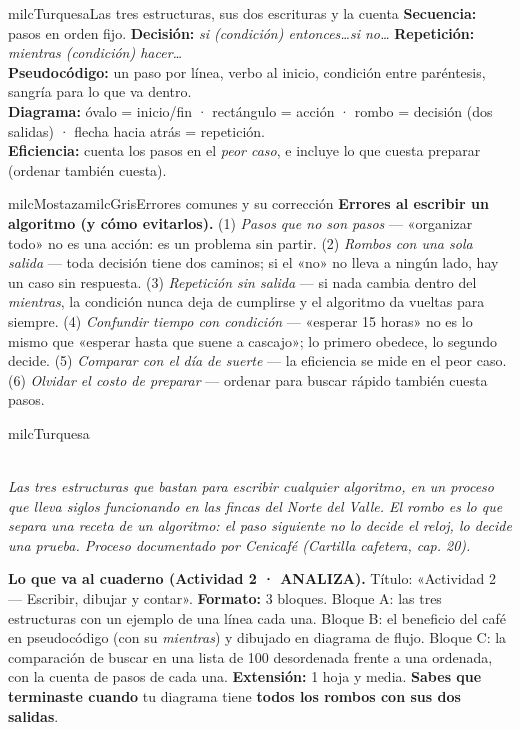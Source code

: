 \documentclass[11pt,letterpaper]{article}
\newcommand{\guiaDiagrama}[2]{%
\begin{center}
\\[1.5mm]
{\footnotesize\itshape\textcolor{milcNegro!75}{#2}}
\end{center}
}
\begin{document}
\begin{drawbox}{milcTurquesa}{Las tres estructuras, sus dos escrituras y la cuenta}
\textbf{Secuencia:} pasos en orden fijo. \textbf{Decisión:} \emph{si (condición) entonces\ldots si no\ldots} \textbf{Repetición:} \emph{mientras (condición) hacer\ldots} \\[1mm]
\textbf{Pseudocódigo:} un paso por línea, verbo al inicio, condición entre paréntesis, sangría para lo que va dentro. \\[1mm]
\textbf{Diagrama:} óvalo = inicio/fin · rectángulo = acción · rombo = decisión (dos salidas) · flecha hacia atrás = repetición. \\[1mm]
\textbf{Eficiencia:} cuenta los pasos en el \emph{peor caso}, e incluye lo que cuesta preparar (ordenar también cuesta).
\end{drawbox}

\begin{softbox}{milcMostaza}{milcGris}{Errores comunes y su corrección}
\textbf{Errores al escribir un algoritmo (y cómo evitarlos).} (1) \emph{Pasos que no son pasos} --- «organizar todo» no es una acción: es un problema sin partir. (2) \emph{Rombos con una sola salida} --- toda decisión tiene dos caminos; si el «no» no lleva a ningún lado, hay un caso sin respuesta. (3) \emph{Repetición sin salida} --- si nada cambia dentro del \emph{mientras}, la condición nunca deja de cumplirse y el algoritmo da vueltas para siempre. (4) \emph{Confundir tiempo con condición} --- «esperar 15 horas» no es lo mismo que «esperar hasta que suene a cascajo»; lo primero obedece, lo segundo decide. (5) \emph{Comparar con el día de suerte} --- la eficiencia se mide en el peor caso. (6) \emph{Olvidar el costo de preparar} --- ordenar para buscar rápido también cuesta pasos.
\end{softbox}

\begin{infoband}{milcTurquesa}
\guiaDiagrama{assets/pensamiento-computacional-2/flujo-beneficio-cafe.tex}{Las tres estructuras que bastan para escribir cualquier algoritmo, en un proceso que lleva siglos funcionando en las fincas del Norte del Valle. El rombo es lo que separa una receta de un algoritmo: el paso siguiente no lo decide el reloj, lo decide una prueba. Proceso documentado por Cenicafé (Cartilla cafetera, cap. 20).}

\textbf{Lo que va al cuaderno (Actividad 2 · ANALIZA).} Título: «Actividad 2 --- Escribir, dibujar y contar». \textbf{Formato:} 3 bloques. Bloque A: las tres estructuras con un ejemplo de una línea cada una. Bloque B: el beneficio del café en pseudocódigo (con su \emph{mientras}) y dibujado en diagrama de flujo. Bloque C: la comparación de buscar en una lista de 100 desordenada frente a una ordenada, con la cuenta de pasos de cada una. \textbf{Extensión:} 1 hoja y media. \textbf{Sabes que terminaste cuando} tu diagrama tiene \textbf{todos los rombos con sus dos salidas}.
\end{infoband}
\end{document}
